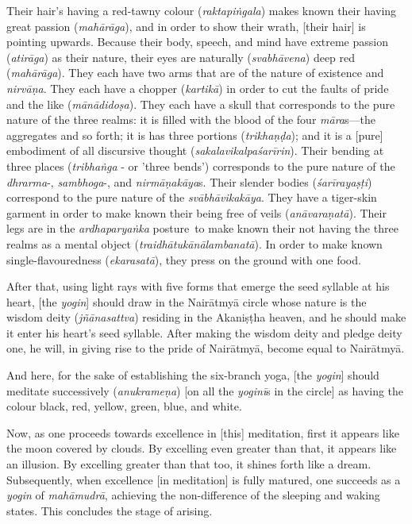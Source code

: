 \documentclass[naipra.tex]{subfiles}
\begin{document}
Their hair's having a red-tawny colour (\emph{raktapiṅgala}) makes known their having great passion (\emph{mahārāga}), and in order to show their wrath, [their hair] is pointing upwards.
Because their body, speech, and mind have extreme passion (\emph{atirāga}) as their nature, their eyes are naturally (\emph{svabhāvena}) deep red (\emph{mahārāga}).
They each have two arms that are of the nature of existence and \emph{nirvāṇa}.
They each have a chopper (\emph{kartikā}) in order to cut the faults of pride and the like (\emph{mānādidoṣa}).
They each have a skull that corresponds to the pure nature of the three realms: it is filled with the blood of the four \emph{māra}s—the aggregates and so forth; it is has three portions (\emph{trikhaṇḍa}); and it is a [pure] embodiment of all discursive thought (\emph{sakalavikalpaśarīrin}).
Their bending at three places (\emph{tribhaṅga} - or 'three bends') corresponds to the pure nature of the \emph{dhrarma}-, \emph{sambhoga}-, and \emph{nirmāṇakāya}s.
Their slender bodies (\emph{śarīrayaṣṭi}) correspond to the pure nature of the \emph{svābhāvikakāya}.
They have a tiger-skin garment in order to make known their being free of veils (\emph{anāvaraṇatā}).
Their legs are \crux in the \emph{ardhaparyaṅka} posture\crux\ to make known their not having the three realms as a mental object (\emph{traidhātukānālambanatā}).
In order to make known single-flavouredness (\emph{ekarasatā}), they press on the ground with one food.

After that, using light rays with five forms that emerge the seed syllable at his heart, [the \emph{yogin}] should draw in the Nairātmyā circle whose nature is the wisdom deity (\emph{jñānasattva}) residing in the Akaniṣṭha heaven, and he should make it enter his heart's seed syllable.
After making the wisdom deity and pledge deity one, he will, in giving rise to the pride of Nairātmyā, become equal to Nairātmyā.

And here, for the sake of establishing the six-branch yoga, [the \emph{yogin}] should meditate successively (\emph{anukrameṇa}) [on all the \emph{yoginī}s in the circle] as having the colour black, red, yellow, green, blue, and white.

Now, as one proceeds towards excellence in [this] meditation, first it appears like the moon covered by clouds.
By excelling even greater than that, it appears like an illusion.
By excelling greater than that too, it shines forth like a dream.
Subsequently, when excellence [in meditation] is fully matured, one succeeds as a \emph{yogin} of \emph{mahāmudrā}, achieving the non-difference of the sleeping and waking states.
This concludes the stage of arising.
\end{document}

